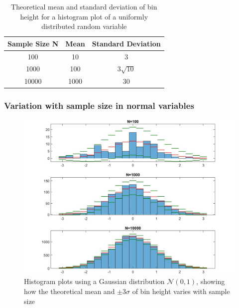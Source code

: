 \documentclass[twoside,twocolumn]{article}
\begin{document}
\begin{table}[h]
\caption{Theoretical mean and standard deviation of bin height for a histogram plot of a uniformly distributed random variable}
\centering
\begin{tabular}{ c | c | c }
Sample Size N & Mean & Standard Deviation \\

\midrule
100 & 10 & 3  \\
1000 & 100 & $3\sqrt{10}$ \\
10000 & 1000 & 30 \\
\end{tabular}
\label{table:tablemeans}
\end{table}
\subsubsection{Variation with sample size in normal variables}
\begin{figure}[h]
  \centering
    \includegraphics[width=\linewidth]{1fmeans}
  \caption{Histogram plots using a Gaussian distribution $\mathcal{N}(0,1)$, showing how the theoretical mean and $\pm3\sigma$ of bin height varies with sample size}
  \label{fig:1fmeans}
\end{figure}
\end{document}
